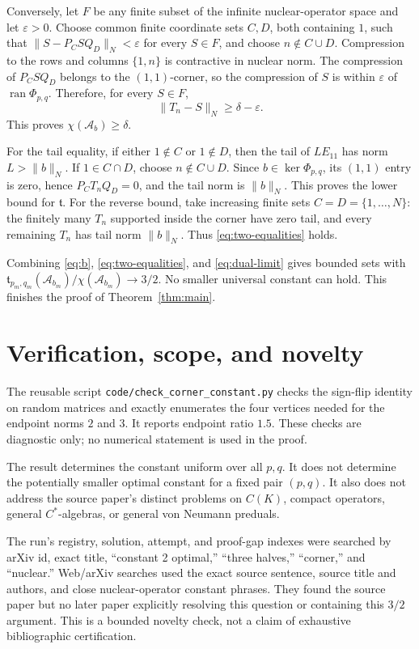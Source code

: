\documentclass[11pt]{article}
\newcommand{\Tail}{\mathfrak t}
\begin{document}
Conversely, let \(F\) be any finite subset of the infinite nuclear-operator
space and let \(\varepsilon>0\).  Choose common finite coordinate sets
\(C,D\), both containing \(1\), such that
\(\|S-P_CS Q_D\|_N<\varepsilon\) for every \(S\in F\), and choose
\(n\notin C\cup D\).  Compression to the rows and columns \(\{1,n\}\) is
contractive in nuclear norm.  The compression of \(P_CS Q_D\) belongs to
the \((1,1)\)-corner, so the compression of \(S\) is within \(\varepsilon\)
of \(\operatorname{ran}\Phi_{p,q}\).  Therefore, for every \(S\in F\),
\[
 \|T_n-S\|_N\ge\delta-\varepsilon.
\]
This proves \(\chi(\mathcal A_b)\ge\delta\).

For the tail equality, if either \(1\notin C\) or \(1\notin D\), then the
tail of \(LE_{11}\) has norm \(L>\|b\|_N\).  If \(1\in C\cap D\), choose
\(n\notin C\cup D\).  Since \(b\in\ker\Phi_{p,q}\), its \((1,1)\) entry is
zero, hence \(P_CT_nQ_D=0\), and the tail norm is \(\|b\|_N\).  This proves
the lower bound for \(\Tail\).  For the reverse bound, take increasing finite
sets \(C=D=\{1,\ldots,N\}\): the finitely many \(T_n\) supported inside the
corner have zero tail, and every remaining \(T_n\) has tail norm \(\|b\|_N\).
Thus \eqref{eq:two-equalities} holds.

Combining \eqref{eq:b}, \eqref{eq:two-equalities}, and
\eqref{eq:dual-limit} gives bounded sets with
\(\Tail_{p_m,q_m}(\mathcal A_{b_m})/\chi(\mathcal A_{b_m})\to3/2\).
No smaller universal constant can hold.  This finishes the proof of
Theorem~\ref{thm:main}.

\section{Verification, scope, and novelty}

The reusable script \texttt{code/check\_corner\_constant.py} checks the
sign-flip identity on random matrices and exactly enumerates the four vertices
needed for the endpoint norms \(2\) and \(3\).  It reports endpoint ratio
\(1.5\).  These checks are diagnostic only; no numerical statement is used in
the proof.

The result determines the constant uniform over all \(p,q\).  It does not
determine the potentially smaller optimal constant for a fixed pair
\((p,q)\).  It also does not address the source paper's distinct problems on
\(C(K)\), compact operators, general \(C^*\)-algebras, or general von Neumann
preduals.

The run's registry, solution, attempt, and proof-gap indexes were searched by
arXiv id, exact title, ``constant 2 optimal,'' ``three halves,'' ``corner,''
and ``nuclear.''  Web/arXiv searches used the exact source sentence, source
title and authors, and close nuclear-operator constant phrases.  They found
the source paper but no later paper explicitly resolving this question or
containing this \(3/2\) argument.  This is a bounded novelty check, not a
claim of exhaustive bibliographic certification.
\end{document}

